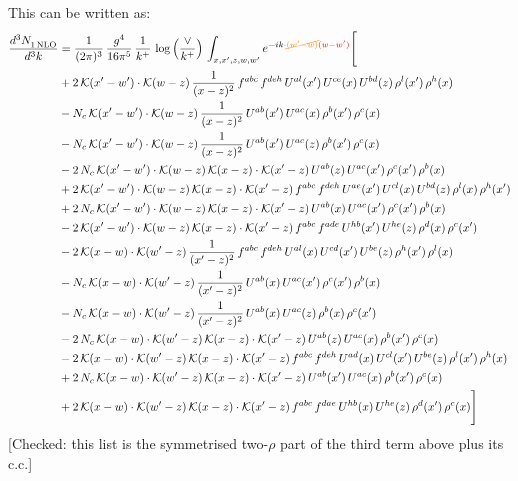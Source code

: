 \documentclass[9pt]{article}
\numberwithin{equation}{section}
\begin{document}
This can be written as:
\begin{align}
    \frac{d^{3}N_{1\,\rm NLO}^{\rm}}{d^{3}k}  & = \frac{1}{(2\pi)^{3}}\,\frac{g^{4}}{16\pi^{5}}\,\frac{1}{k^{+}}\,\log{\left(\frac{\vee}{k^{+}}\right)}\, \int_{x,x',z,w,w'}e^{-ik\cdot{\color{orange}\cancel{(w'-w)}}{\color{red}(w-w')}}\Bigg[\notag\\ & +2\,\mathcal{K}(x'-w')\cdot\mathcal{K}(w-z)\,\frac{1}{(x-z)^{2}}\,f^{abc}\,f^{deh}\,U^{al}(x')\,U^{ce}(x)\,U^{bd}(z)\,\rho^{l}(x')\,\rho^{h}(x)\notag \\ 
&-N_{c}\,\mathcal{K}(x'-w')\cdot\mathcal{K}(w-z)\,\frac{1}{(x-z)^{2}}\,U^{ab}(x')\,U^{ac}(x)\,\rho^{b}(x')\,\rho^{c}(x)\notag \\ 
&-N_{c}\,\mathcal{K}(x'-w')\cdot\mathcal{K}(w-z)\,\frac{1}{(x-z)^{2}}\,U^{ab}(x')\,U^{ac}(z)\,\rho^{b}(x')\,\rho^{c}(x)\notag \\ 
&-2\,N_{c}\,\mathcal{K}(x'-w')\cdot\mathcal{K}(w-z)\,\mathcal{K}(x-z)\cdot\mathcal{K}(x'-z)\,U^{ab}(z)\,U^{ac}(x')\,\rho^{c}(x')\,\rho^{b}(x)\notag \\ 
&+2\,\mathcal{K}(x'-w')\cdot\mathcal{K}(w-z)\,\mathcal{K}(x-z)\cdot\mathcal{K}(x'-z)\,f^{abc}\,f^{deh}\,U^{ae}(x')\,U^{cl}(x)\,U^{bd}(z)\,\rho^{l}(x)\,\rho^{h}(x')\notag \\ 
&+2\,N_{c}\,\mathcal{K}(x'-w')\cdot\mathcal{K}(w-z)\,\mathcal{K}(x-z)\cdot\mathcal{K}(x'-z)\,U^{ab}(x)\,U^{ac}(x')\,\rho^{c}(x')\,\rho^{b}(x)\notag \\ 
&-2\,\mathcal{K}(x'-w')\cdot\mathcal{K}(w-z)\,\mathcal{K}(x-z)\cdot\mathcal{K}(x'-z)\,f^{abc}\,f^{ade}\,U^{hb}(x')\,U^{he}(z)\,\rho^{d}(x)\,\rho^{c}(x')\notag \\ 
&-2\,\mathcal{K}(x-w)\cdot\mathcal{K}(w'-z)\,\frac{1}{(x'-z)^{2}}\,f^{abc}\,f^{deh}\,U^{al}(x)\,U^{cd}(x')\,U^{be}(z)\,\rho^{h}(x')\,\rho^{l}(x)\notag \\ 
&-N_{c}\,\mathcal{K}(x-w)\cdot\mathcal{K}(w'-z)\,\frac{1}{(x'-z)^{2}}\,U^{ab}(x)\,U^{ac}(x')\,\rho^{c}(x')\,\rho^{b}(x)\notag \\ 
&-N_{c}\,\mathcal{K}(x-w)\cdot\mathcal{K}(w'-z)\,\frac{1}{(x'-z)^{2}}\,U^{ab}(x)\,U^{ac}(z)\,\rho^{b}(x)\,\rho^{c}(x')\notag \\ 
&-2\,N_{c}\,\mathcal{K}(x-w)\cdot\mathcal{K}(w'-z)\,\mathcal{K}(x-z)\cdot\mathcal{K}(x'-z)\,U^{ab}(z)\,U^{ac}(x)\,\rho^{b}(x')\,\rho^{c}(x)\notag \\ 
&-2\,\mathcal{K}(x-w)\cdot\mathcal{K}(w'-z)\,\mathcal{K}(x-z)\cdot\mathcal{K}(x'-z)\,f^{abc}\,f^{deh}\,U^{ad}(x)\,U^{cl}(x')\,U^{be}(z)\,\rho^{l}(x')\,\rho^{h}(x)\notag \\ 
&+2\,N_{c}\,\mathcal{K}(x-w)\cdot\mathcal{K}(w'-z)\,\mathcal{K}(x-z)\cdot\mathcal{K}(x'-z)\,U^{ab}(x')\,U^{ac}(x)\,\rho^{b}(x')\,\rho^{c}(x)\notag \\ 
&+2\,\mathcal{K}(x-w)\cdot\mathcal{K}(w'-z)\,\mathcal{K}(x-z)\cdot\mathcal{K}(x'-z)\,f^{abc}\,f^{dae}\,U^{hb}(x)\,U^{he}(z)\,\rho^{d}(x')\,\rho^{c}(x)\Bigg]
\end{align} {\color{red}[Checked: this list is the symmetrised two-$\rho$ part of the third term above plus its c.c.]}\par\noindent
\end{document}
